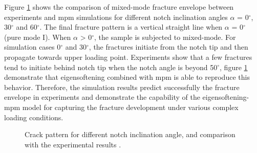 \message{ !name(2020_EFM_MPM_Eigensoftening.tex)}\documentclass[preprint,12pt,a4paper]{elsarticle}
\begin{document}
Figure \ref{fig:Figure-Angle-Forces-test-damage-pattern} shows the
comparison of mixed-mode fracture envelope between experiments and
\acrshort{mpm} simulations for different notch inclination angles
$\alpha$ = 0$^{\circ}$, 30$^{\circ}$ and 60$^{\circ}$. The final
fracture pattern is a vertical straight line when $\alpha$ = 0$^{\circ}$  (pure mode I). 
When $\alpha$ > 0$^{\circ}$, the sample is
subjected to mixed-mode. For simulation cases 0$^{\circ}$ and 30$^{\circ}$, the fractures
initiate from the notch tip and then propagate towards upper loading
point. Experiments show that a few fractures tend to initiate behind
notch tip when the notch angle is beyond 50$^{\circ}$, figure
\ref{fig:Figure-Angle-Forces-test-damage-pattern} demonstrate that
eigensoftening combined with \acrshort{mpm} is able to reproduce this
behavior. Therefore, the simulation results predict successfully the
fracture envelope in experiments and demonstrate the capability of
the eigensoftening-\acrshort{mpm} model for capturing the fracture
development under various complex loading conditions. 
\begin{figure}
\centering
{}
\caption{Crack pattern for different notch inclination angle, and
  comparison with the experimental results  \cite{LIM_1993}.}
\label{fig:Figure-Angle-Forces-test-damage-pattern}
\end{figure}
\end{document}
